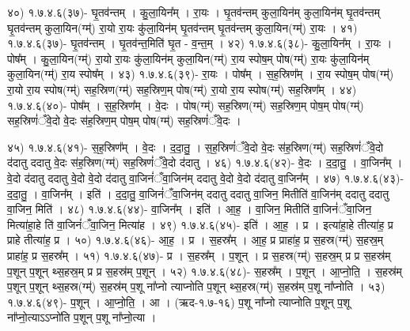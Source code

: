 
४०)       १.७.४.६(३७)-            घृ॒तव॑न्तम् । कु॒ला॒यिन᳚म् । रा॒यः ।
घृ॒तव॑न्तम् कुला॒यिन॑म् कुला॒यिन॑म् घृ॒तव॑न्तम् घृ॒तव॑न्तम् कुला॒यिन(ग्म्॑) रा॒यो रा॒यः
कु॑ला॒यिन॑म् घृ॒तव॑न्तम् घृ॒तव॑न्तम् कुला॒यिन(ग्म्॑) रा॒यः ।
४१)       १.७.४.६(३७)-            घृ॒तव॑न्तम् ।
घृ॒तव॑न्त॒मिति॑ घृ॒त - व॒न्त॒म् ।
४२)       १.७.४.६(३८)-            कु॒ला॒यिन᳚म् । रा॒यः । पोष᳚म् ।
कु॒ला॒यिन(ग्म्॑) रा॒यो रा॒यः कु॑ला॒यिन॑म् कुला॒यिन(ग्म्॑) रा॒य स्पोष॒म् पोष(ग्म्॑) रा॒यः कु॑ला॒यिन॑म्
कुला॒यिन(ग्म्॑) रा॒य स्पोष᳚म् ।
४३)       १.७.४.६(३९)-            रा॒यः । पोष᳚म् । स॒ह॒स्रिण᳚म् ।
रा॒य स्पोष॒म् पोष(ग्म्॑) रा॒यो रा॒य स्पोष(ग्म्॑) सह॒स्रिण(ग्म्॑) सह॒स्रिण॒म् पोष(ग्म्॑) रा॒यो रा॒य
स्पोष(ग्म्॑) सह॒स्रिण᳚म् ।
४४)       १.७.४.६(४०)-            पोष᳚म् । स॒ह॒स्रिण᳚म् । वे॒दः ।
पोष(ग्म्॑) सह॒स्रिण(ग्म्॑) सह॒स्रिण॒म् पोष॒म् पोष(ग्म्॑) सह॒स्रिणं॑ँवे॒दो वे॒दः स॑ह॒स्रिण॒म् पोष॒म्
पोष(ग्म्॑) सह॒स्रिणं॑ँवे॒दः ।




४५)      १.७.४.६(४१)-           स॒ह॒स्रिण᳚म् । वे॒दः । द॒दा॒तु॒ ।
स॒ह॒स्रिणं॑ँवे॒दो वे॒दः स॑ह॒स्रिण(ग्म्॑) सह॒स्रिणं॑ँवे॒दो द॑दातु ददातु वे॒दः स॑ह॒स्रिण(ग्म्॑)
सह॒स्रिणं॑ँवे॒दो द॑दातु ।
४६)      १.७.४.६(४२)-           वे॒दः । द॒दा॒तु॒ । वा॒जिन᳚म् ।
वे॒दो द॑दातु ददातु वे॒दो वे॒दो द॑दातु वा॒जिनं॑ँवा॒जिन॑म् ददातु वे॒दो वे॒दो द॑दातु वा॒जिन᳚म् ।
४७)      १.७.४.६(४३)-           द॒दा॒तु॒ । वा॒जिन᳚म् । इति॑ ।
द॒दा॒तु॒ वा॒जिनं॑ँवा॒जिन॑म् ददातु ददातु वा॒जिन॒ मितीति॑ वा॒जिन॑म् ददातु ददातु वा॒जिन॒ मिति॑ ।
४८)      १.७.४.६(४४)-           वा॒जिन᳚म् । इति॑ । आ॒ह॒ ।
वा॒जिन॒ मितीति॑ वा॒जिनं॑ँवा॒जिन॒ मित्या॑हा॒हे ति॑ वा॒जिनं॑ँवा॒जिन॒ मित्या॑ह ।
४९)      १.७.४.६(४५)-           इति॑ । आ॒ह॒ । प्र ।
इत्या॑हा॒हे तीत्या॑ह॒ प्र प्राहे तीत्या॑ह॒ प्र ।
५०)      १.७.४.६(४६)-           आ॒ह॒ । प्र । स॒हस्र᳚म् ।
आ॒ह॒ प्र प्राहा॑ह॒ प्र स॒हस्र(ग्म्॑) स॒हस्र॒म् प्राहा॑ह॒ प्र स॒हस्र᳚म् ।
५१)      १.७.४.६(४७)-           प्र । स॒हस्र᳚म् । प॒शून् ।
प्र स॒हस्र(ग्म्॑) स॒हस्र॒म् प्र प्र स॒हस्र॑म् प॒शून् प॒शून् थ्स॒हस्र॒म् प्र प्र स॒हस्र॑म् प॒शून् ।
५२)      १.७.४.६(४८)-           स॒हस्र᳚म् । प॒शून् । आ॒प्नो॒ति॒ ।
स॒हस्र॑म् प॒शून् प॒शून् थ्स॒हस्र(ग्म्॑) स॒हस्र॑म् प॒शू ना᳚प्नो त्याप्नोति प॒शून् थ्स॒हस्र(ग्म्॑)
स॒हस्र॑म् प॒शू ना᳚प्नोति ।
५३)      १.७.४.६(४९)-           प॒शून् । आ॒प्नो॒ति॒ । आ । (ऋद-१.७-१६)
प॒शू ना᳚प्नो त्याप्नोति प॒शून् प॒शू ना᳚प्नो॒त्याऽऽप्नो॑ति प॒शून् प॒शू ना᳚प्नो॒त्या ।



